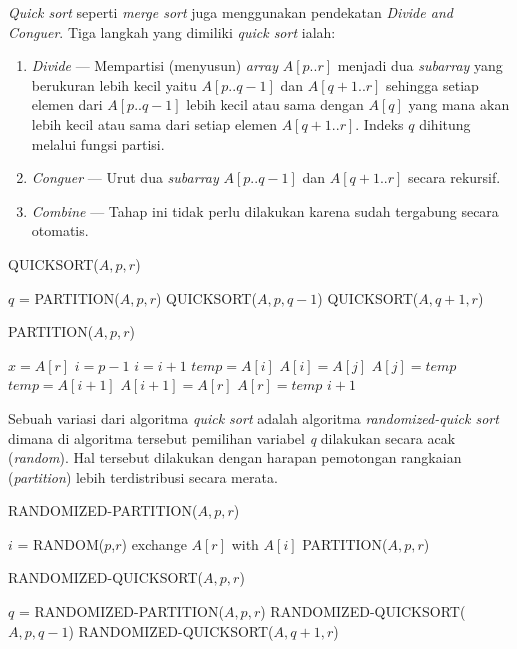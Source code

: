 \textit{Quick sort} seperti \textit{merge sort} juga menggunakan pendekatan \textit{Divide and Conguer}. Tiga langkah yang dimiliki \textit{quick sort} ialah:
\begin{enumerate}
	\item \textit{Divide} --- Mempartisi (menyusun) \textit{array} $A[p..r]$ menjadi dua \textit{subarray} yang berukuran lebih kecil yaitu $A[p..q-1]$ dan $A[q+1..r]$ sehingga setiap elemen dari $A[p..q-1]$ lebih kecil atau sama dengan $A[q]$ yang mana akan lebih kecil atau sama dari setiap elemen $A[q+1..r]$. Indeks $q$ dihitung melalui fungsi partisi.
	\item \textit{Conguer} --- Urut dua \textit{subarray} $A[p..q-1]$ dan $A[q+1..r]$ secara rekursif.
	\item \textit{Combine} --- Tahap ini tidak perlu dilakukan karena sudah tergabung secara otomatis.
\end{enumerate}

\begin{algorithm}[H]
	\caption{QUICKSORT($A,p,r$)}
	\begin{algorithmic}[1]
			\STATE $q$ = PARTITION($A,p,r$)
			\STATE QUICKSORT($A,p,q-1$)
			\STATE QUICKSORT($A,q+1,r$)
		\ENDIF
	\end{algorithmic}
\end{algorithm}

\begin{algorithm}[H]
	\caption{PARTITION($A,p,r$)}
	\begin{algorithmic}[1]
		\STATE $x = A[r]$
		\STATE $i = p-1$
				\STATE $i = i + 1$
				\STATE $temp = A[i]$
				\STATE $A[i] = A[j]$
				\STATE $A[j] = temp$
			\ENDIF
		\ENDFOR
		\STATE $temp = A[i+1]$
		\STATE $A[i+1] = A[r]$
		\STATE $A[r] = temp$
		\RETURN $i+1$
	\end{algorithmic}
\end{algorithm}

Sebuah variasi dari algoritma \textit{quick sort} adalah algoritma \textit{randomized-quick sort} dimana di algoritma tersebut pemilihan variabel \textit{q} dilakukan secara acak (\textit{random}). Hal tersebut dilakukan dengan harapan pemotongan rangkaian (\textit{partition}) lebih terdistribusi secara merata.

\begin{algorithm}[H]
	\caption{RANDOMIZED-PARTITION($A,p,r$)}
	\begin{algorithmic}[1]
		\STATE $i$ = RANDOM($p$,$r$)
		\STATE exchange $A[r]$ with $A[i]$
		\RETURN PARTITION($A,p,r$)
	\end{algorithmic}
\end{algorithm}

\begin{algorithm}[H]
	\caption{RANDOMIZED-QUICKSORT($A,p,r$)}
	\begin{algorithmic}[1]
			\STATE $q$ = RANDOMIZED-PARTITION($A,p,r$)
			\STATE RANDOMIZED-QUICKSORT($A,p,q-1$)
			\STATE RANDOMIZED-QUICKSORT($A,q+1,r$)
		\ENDIF
	\end{algorithmic}
\end{algorithm}